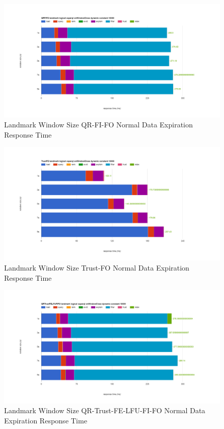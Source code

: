 \begin{figure}[!htbp]
	\centering
    \includegraphics[width=\textwidth]{img/app3-land-ws-qrfifo-normal-r.png}
    \caption{Landmark Window Size QR-FI-FO Normal Data Expiration Response Time}
\end{figure}
\begin{figure}[!htbp]
	\centering
    \includegraphics[width=\textwidth]{img/app3-land-ws-trustfo-normal-r.png}
    \caption{Landmark Window Size Trust-FO Normal Data Expiration Response Time}
\end{figure}
\begin{figure}[!htbp]
	\centering
    \includegraphics[width=\textwidth]{img/app3-land-ws-qrtrustfelfufifo-normal-r.png}
    \caption{Landmark Window Size QR-Trust-FE-LFU-FI-FO Normal Data Expiration Response Time}
\end{figure}
